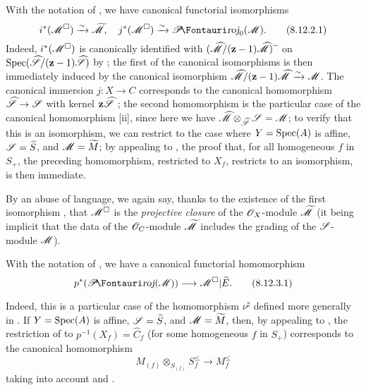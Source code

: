 \begin{proposition}[8.12.2]
\label{II.8.12.2}
With the notation of , we have canonical functorial isomorphisms
\[
\label{II.8.12.2.1}
    i^*(\sh{M}^\square)\simto\widetilde{\sh{M}},
    \quad
    j^*(\sh{M}^\square)\simto\shProj_0(\sh{M}).
\tag{8.12.2.1}
\]
Indeed, $i^*(\mathscr{M}^\square)$ is canonically identified with $(\widehat{\mathscr{M}}/(\mathbf{z}-1)\widehat{\mathscr{M}}){\,\widetilde{\,}\,}$ on $\operatorname{Spec}(\widehat{\mathscr{S}}/(\mathbf{z}-1)\widehat{\mathscr{S}})$ by ;
the first of the canonical isomorphisms  is then immediately induced  by the canonical isomorphism $\widehat{\mathscr{M}}/(\mathbf{z}-1)\widehat{\mathscr{M}}\xrightarrow{\sim}\mathscr{M}$.
The canonical immersion $j:X\to C$ corresponds to the canonical homomorphism $\widehat{\sh{S}}\to\sh{S}$ with kernel $\mathbf{z}\widehat{\mathscr{S}}$ ;
the second homomorphism  is the particular case of the canonical homomorphism [ii], since here we have $\widehat{\mathscr{M}}\otimes_{\widehat{\mathscr{S}}}\mathscr{S}=\mathscr{M}$;
to verify that this is an isomorphism, we can restrict to the case where $Y=\operatorname{Spec}(A)$ is affine, $\mathscr{S}=\widetilde{S}$, and $\mathscr{M}=\widetilde{M}$;
by appealing to , the proof that, for all homogeneous $f$ in $S_+$, the preceding homomorphism, restricted to $X_f$, restricts to an isomorphism, is then immediate.
\end{proposition}


By an abuse of language, we again say, thanks to the existence of the first isomorphism , that $\mathscr{M}^\square$ is the \emph{projective closure} of the $\mathscr{O}_X$-module $\widetilde{\mathscr{M}}$ (it being implicit that the data of the $\mathscr{O}_C$-module $\widetilde{\mathscr{M}}$ includes the grading of the $\mathscr{S}$-module $\mathscr{M}$).

\begin{env}[8.12.3]
\label{II.8.12.3}
With the notation of , we have a canonical functorial homomorphism
\[
\label{II.8.12.3.1}
    p^*(\shProj(\sh{M}))\to\sh{M}^\square|\widehat{E}.
\tag{8.12.3.1}
\]

Indeed, this is a particular case of the homomorphism $\nu^\sharp$ defined more generally in .
If $Y=\operatorname{Spec}(A)$ is affine, $\mathscr{S}=\widetilde{S}$, and $\mathscr{M}=\widetilde{M}$, then, by appealing to , the restriction of  to $p^{-1}(X_f)=\widehat{C}_f$ (for some homogeneous $f$ in $S_+$) corresponds to the canonical homomorphism
\[
\label{II.8.12.3.2}
    M_{(f)}\otimes_{S_{(f)}}S_f^\leq \to M_f^\leq
\tag{8.12.3.2}
\]
taking into account  and .
\end{env}

